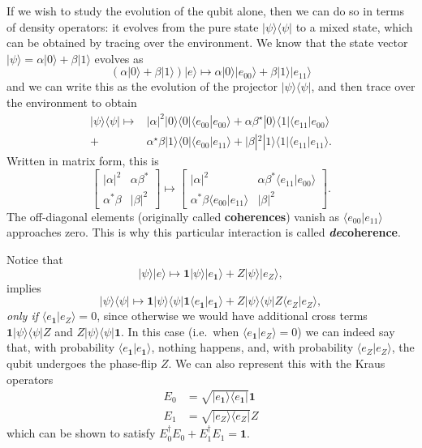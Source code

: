 \documentclass[fleqn,a4paper]{article}
\theoremstyle{definition}
\theoremstyle{definition}
\theoremstyle{definition}
\theoremstyle{definition}
\theoremstyle{remark}
\begin{document}
If we wish to study the evolution of the qubit alone, then we can do so in terms of density operators: it evolves from the pure state \(|\psi\rangle\langle\psi|\) to a mixed state, which can be obtained by tracing over the environment.
We know that the state vector \(|\psi\rangle=\alpha|0\rangle+\beta|1\rangle\) evolves as
\[
  \left( \alpha|0\rangle +\beta |1\rangle\right)|e\rangle \longmapsto
  \alpha |0\rangle|e_{00}\rangle +\beta |1\rangle |e_{11}\rangle
\]
and we can write this as the evolution of the projector \(|\psi\rangle\langle\psi|\), and then trace over the environment to obtain
\[
  \begin{aligned}
    |\psi\rangle\langle\psi| \longmapsto & |\alpha|^2|0\rangle\langle 0| \langle e_{00}|e_{00}\rangle+ \alpha\beta^\star |0\rangle\langle 1|\langle e_{11}|e_{00}\rangle
  \\+ &\alpha^\star\beta |1\rangle\langle 0|\langle e_{00}|e_{11}\rangle  + |\beta|^2|1\rangle\langle 1|\langle e_{11}|e_{11}\rangle.
  \end{aligned}
\]
Written in matrix form, this is
\[
  \begin{bmatrix}
    |\alpha|^2 & \alpha\beta^\ast
  \\\alpha^\ast\beta & |\beta|^2
  \end{bmatrix}
  \longmapsto
  \begin{bmatrix}
    |\alpha|^2 & \alpha\beta^\ast \langle e_{11}|e_{00}\rangle
    \\\alpha^\ast\beta \langle e_{00}|e_{11}\rangle & |\beta|^2
  \end{bmatrix}.
\]
The off-diagonal elements (originally called \textbf{coherences}) vanish as \(\langle e_{00}|e_{11}\rangle\) approaches zero.
This is why this particular interaction is called \textbf{\emph{de}coherence}.

Notice that
\[
|\psi\rangle|e\rangle \longmapsto \mathbf{1}|\psi\rangle|e_{\mathbf{1}}\rangle+Z|\psi\rangle|e_Z\rangle,
\]
implies
\[
|\psi\rangle\langle\psi|\longmapsto \mathbf{1}|\psi\rangle\langle\psi| \mathbf{1}\langle e_{\mathbf{1}}|e_{\mathbf{1}}\rangle +Z|\psi\rangle\langle\psi| Z\langle e_Z|e_Z\rangle,
\]
\emph{only if} \(\langle e_{\mathbf{1}}|e_Z\rangle=0\), since otherwise we would have additional cross terms \(\mathbf{1}|\psi\rangle\langle\psi|Z\) and \(Z|\psi\rangle\langle\psi|\mathbf{1}\).
In this case (i.e.~when \(\langle e_{\mathbf{1}}|e_Z\rangle=0\)) we can indeed say that, with probability \(\langle e_{\mathbf{1}}|e_{\mathbf{1}}\rangle\), nothing happens, and, with probability \(\langle e_Z|e_Z\rangle\), the qubit undergoes the phase-flip \(Z\).
We can also represent this with the Kraus operators
\[
  \begin{aligned}
    E_0
    &= \sqrt{|e_\mathbf{1}\rangle\langle e_\mathbf{1}|} \mathbf{1}
  \\E_1
    &= \sqrt{|e_Z\rangle\langle e_Z|} Z
  \end{aligned}
\]
which can be shown to satisfy \(E_0^\dagger E_0+E_1^\dagger E_1=\mathbf{1}\).
\end{document}

